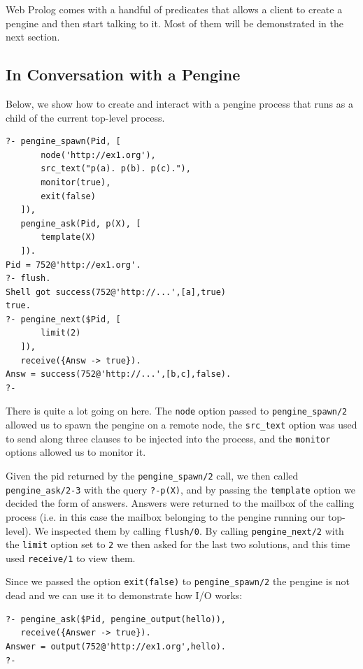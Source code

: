 \documentclass{tlp}
\begin{document}
Web Prolog comes with a handful of predicates that allows a client to create a pengine and then start talking to it. Most of them will be demonstrated in the next section.


\subsection{In Conversation with a Pengine}

\noindent Below, we show how to create and interact with a pengine process that runs as a child of the current top-level process. %

\begin{lstlisting}
?- pengine_spawn(Pid, [
       node('http://ex1.org'),
       src_text("p(a). p(b). p(c)."),
       monitor(true),
       exit(false)
   ]),
   pengine_ask(Pid, p(X), [
       template(X)
   ]).
Pid = 752@'http://ex1.org'.
?- flush.
Shell got success(752@'http://...',[a],true)
true.
?- pengine_next($Pid, [
       limit(2)
   ]),
   receive({Answ -> true}).
Answ = success(752@'http://...',[b,c],false).
?-
\end{lstlisting}

\noindent There is quite a lot going on here. The \texttt{node} option passed to \texttt{pengine\_spawn/2} allowed us to spawn the pengine on a remote node, the \texttt{src\_text} option was used to send along three clauses to be injected into the process, and the \texttt{monitor} options allowed us to monitor it. %

Given the pid returned by the \texttt{pengine\_spawn/2} call, we then called \texttt{pengine\_ask/2-3} with the query \texttt{?-p(X)}, and by passing the \texttt{template} option we decided the form of answers. Answers were returned to the mailbox of the calling process (i.e. in this case the mailbox belonging to the pengine running our top-level). We inspected them by calling \texttt{flush/0}. By calling \texttt{pengine\_next/2} with the \texttt{limit} option set to \texttt{2} we then asked for the last two solutions, and this time used \texttt{receive/1} to view them.

Since we passed the option \texttt{exit(false)} to \texttt{pengine\_spawn/2} the pengine is not dead and we can use it to demonstrate how I/O works:

\begin{lstlisting}
?- pengine_ask($Pid, pengine_output(hello)),
   receive({Answer -> true}).
Answer = output(752@'http://ex1.org',hello).
?-
\end{lstlisting}
\end{document}
